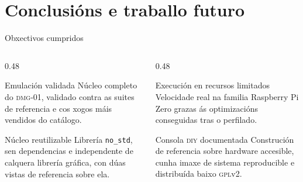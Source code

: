\section{Conclusións e traballo futuro}

\begin{frame}{Obxectivos cumpridos}
  \small
  \begin{columns}[t]
    \begin{column}{0.48\textwidth}
      \begin{block}{Emulación validada}
        Núcleo completo do \textsc{dmg}-01, validado contra as suites de
        referencia e cos xogos máis vendidos do catálogo.
      \end{block}
      \begin{block}{Núcleo reutilizable}
        Librería \texttt{no\_std}, sen dependencias e independente de calquera
        librería gráfica, con dúas vistas de referencia sobre ela.
      \end{block}
    \end{column}
    \begin{column}{0.48\textwidth}
      \begin{block}{Execución en recursos limitados}
        Velocidade real na familia Raspberry Pi Zero grazas ás optimizacións conseguidas tras o perfilado.
      \end{block}
      \begin{block}{Consola \textsc{diy} documentada}
        Construción de referencia sobre hardware accesible, cunha imaxe de
        sistema reproducible e distribuída baixo \textsc{gpl}v2.
      \end{block}
    \end{column}
  \end{columns}
\end{frame}

